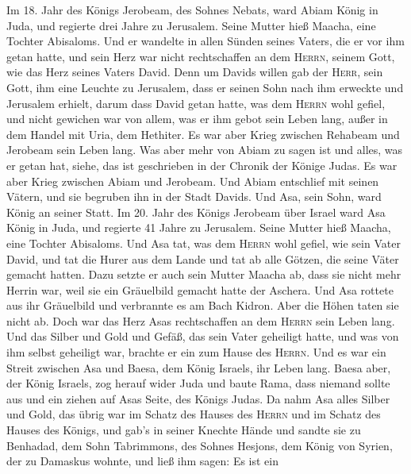  Im 18. Jahr des Königs Jerobeam, des Sohnes Nebats, ward
Abiam König in Juda,  und regierte drei Jahre zu
Jerusalem. Seine Mutter hieß Maacha, eine Tochter Abisaloms.
 Und er wandelte in allen Sünden seines Vaters, die er vor
ihm getan hatte, und sein Herz war nicht rechtschaffen an dem
\textsc{Herrn}, seinem Gott, wie das Herz seines Vaters David.
 Denn um Davids willen gab der \textsc{Herr}, sein Gott,
ihm eine Leuchte zu Jerusalem, dass er seinen Sohn nach ihm erweckte und
Jerusalem erhielt,  darum dass David getan hatte, was dem
\textsc{Herrn} wohl gefiel, und nicht gewichen war von allem, was er ihm
gebot sein Leben lang, außer in dem Handel mit Uria, dem Hethiter.
 Es war aber Krieg zwischen Rehabeam und Jerobeam sein
Leben lang.  Was aber mehr von Abiam zu sagen ist und
alles, was er getan hat, siehe, das ist geschrieben in der Chronik der
Könige Judas. Es war aber Krieg zwischen Abiam und Jerobeam.
 Und Abiam entschlief mit seinen Vätern, und sie begruben
ihn in der Stadt Davids. Und Asa, sein Sohn, ward König an seiner Statt.
 Im 20. Jahr des Königs Jerobeam über Israel ward Asa
König in Juda,  und regierte 41 Jahre zu Jerusalem. Seine
Mutter hieß Maacha, eine Tochter Abisaloms.  Und Asa tat,
was dem \textsc{Herrn} wohl gefiel, wie sein Vater David,
 und tat die Hurer aus dem Lande und tat ab alle Götzen,
die seine Väter gemacht hatten.  Dazu setzte er auch sein
Mutter Maacha ab, dass sie nicht mehr Herrin war, weil sie ein
Gräuelbild gemacht hatte der Aschera. Und Asa rottete aus ihr Gräuelbild
und verbrannte es am Bach Kidron.  Aber die Höhen taten
sie nicht ab. Doch war das Herz Asas rechtschaffen an dem \textsc{Herrn}
sein Leben lang.  Und das Silber und Gold und Gefäß, das
sein Vater geheiligt hatte, und was von ihm selbst geheiligt war,
brachte er ein zum Hause des \textsc{Herrn}.  Und es war
ein Streit zwischen Asa und Baesa, dem König Israels, ihr Leben lang.
 Baesa aber, der König Israels, zog herauf wider Juda und
baute Rama, dass niemand sollte aus und ein ziehen auf Asas Seite, des
Königs Judas.  Da nahm Asa alles Silber und Gold, das
übrig war im Schatz des Hauses des \textsc{Herrn} und im Schatz des
Hauses des Königs, und gab's in seiner Knechte Hände und sandte sie zu
Benhadad, dem Sohn Tabrimmons, des Sohnes Hesjons, dem König von Syrien,
der zu Damaskus wohnte, und ließ ihm sagen:  Es ist ein
